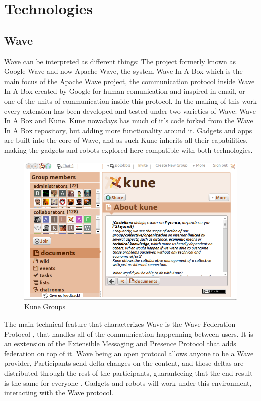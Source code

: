 \newpage
\section{Technologies}

\subsection{Wave}
Wave can be interpreted as different things: The project formerly known as Google Wave and now Apache Wave, the system Wave In A Box which is the main focus of the Apache Wave project, the communication protocol inside Wave In A Box created by Google for human comunication and inspired in email, or one of the units of communication inside this protocol. In the making of this work every extension has been developed and tested under two varieties of Wave: Wave In A Box and Kune. Kune nowadays has much of it's code forked from the Wave In A Box repository, but adding more functionality around it. Gadgets and apps are built into the core of Wave, and as such Kune inherits all their capabilities, making the gadgets and robots explored here compatible with both technologies.
\begin{figure}[H]
  \center
    \includegraphics[keepaspectratio, scale=0.4]{Media/Captures/Wave/Kune_Groups.png}
  \caption{Kune Groups}
  \label{fig:kune_groups}
\end{figure}
The main technical feature that characterizes Wave is the Wave Federation Protocol \cite{ref:wave_federated_protocol}, that handles all of the communication happenning between users. It is an esxtension of the Extensible Messaging and Presence Protocol \cite{ref:xmpp} that adds federation on top of it. Wave being an open protocol allows anyone to be a Wave provider, Participants send delta changes on the content, and those deltas are distributed through the rest of the participants, guaranteeing that the end result is the same for everyone \cite{ref:federating_websites_google_wave}. Gadgets and robots will work under this environment, interacting with the Wave protocol.

